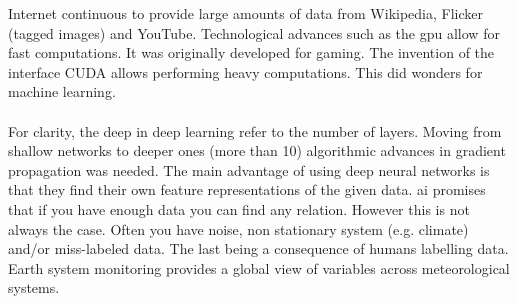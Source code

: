 Internet continuous to provide large amounts of data from Wikipedia, Flicker (tagged images) and YouTube. Technological advances such as the \acrfull{gpu} allow for fast computations. It was originally developed for gaming. The invention of the interface CUDA allows performing heavy computations. This did wonders for machine learning.
\\ \\ 
For clarity, the deep in deep learning refer to the number of layers. Moving from shallow networks to deeper ones (more than 10) algorithmic advances in gradient propagation was needed. The main advantage of using deep neural networks is that they find their own feature representations of the given data. \acrfull{ai} promises that if you have enough data you can find any relation. However this is not always the case. Often you have noise, non stationary system (e.g. climate) and/or miss-labeled data. The last  being a consequence of humans labelling data. Earth system monitoring provides a global view of variables across meteorological systems. %




